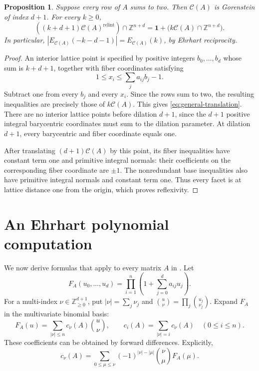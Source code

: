 \documentclass[11pt, letterpaper, english]{amsart}
\theoremstyle{teoremas}
\newtheorem{proposition}[theorem]{Proposition}
\theoremstyle{definition}
\newcommand{\Z}{\mathbb{Z}}
\newcommand{\cC}{\mathcal C}
\begin{document}
\begin{proposition}\label{prop:row-two}
Suppose every row of $A$ sums to two. Then $\cC(A)$ is Gorenstein
of index $d+1$. For every $k\ge0$,
\begin{equation}\label{eq:general-translation}
 ((k+d+1)\cC(A)^{\operatorname{relint}})\cap\Z^{n+d}
 =\mathbf1+\bigl(k\cC(A)\cap\Z^{n+d}\bigr).
\end{equation}
In particular, $|E_{\cC(A)}(-k-d-1)|=E_{\cC(A)}(k)$, by Ehrhart reciprocity.
\end{proposition}
\begin{proof}
An interior lattice point is specified by positive integers
$b_0,\ldots,b_d$ whose sum is $k+d+1$, together with fiber coordinates
satisfying
\[
 1\le x_i\le\sum_j a_{ij}b_j-1.
\]
Subtract one from every $b_j$ and every $x_i$. Since the rows sum to
two, the resulting inequalities are precisely those of $k\cC(A)$.
This gives \eqref{eq:general-translation}. There are no interior
lattice points before dilation $d+1$, since the $d+1$ positive integral
barycentric coordinates must sum to the dilation parameter. At dilation
$d+1$, every barycentric and fiber coordinate equals one.

After translating $(d+1)\cC(A)$ by this point, its fiber inequalities
have constant term one and primitive integral normals: their
coefficients on the corresponding fiber coordinate are $\pm1$.
The nonredundant base inequalities also have primitive integral normals
and constant term one. Thus every facet is at lattice distance one
from the origin, which proves reflexivity.
\end{proof}

\section{An Ehrhart polynomial computation}\label{sec:enumeration}

We now derive formulas that apply to every matrix $A$ in
. Let
\[
 F_A(u_0,\ldots,u_d)=\prod_{i=1}^n
            \left(1+\sum_{j=0}^d a_{ij}u_j\right).
\]
For a multi-index $\nu\in\Z_{\ge0}^{d+1}$, put
$|\nu|=\sum_j\nu_j$ and
$\binom{u}{\nu}=\prod_j\binom{u_j}{\nu_j}$.
Expand $F_A$ in the multivariate binomial basis:
\begin{equation}\label{eq:newton-coefficients}
 F_A(u)=\sum_{|\nu|\le n}c_\nu(A)\binom{u}{\nu},
 \qquad
 c_i(A)=\sum_{|\nu|=i}c_\nu(A)\quad(0\le i\le n).
\end{equation}
These coefficients can be obtained by forward differences. Explicitly,
\[
 c_\nu(A)=\sum_{0\le\mu\le\nu}
       (-1)^{|\nu|-|\mu|}\binom{\nu}{\mu}F_A(\mu).
\]
\end{document}
